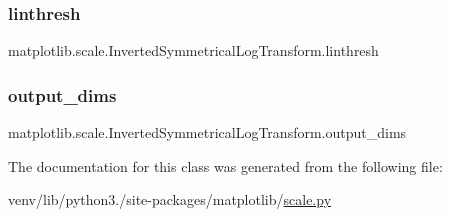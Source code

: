 \subsubsection{\texorpdfstring{linthresh}{linthresh}}
{\footnotesize\ttfamily matplotlib.\+scale.\+Inverted\+Symmetrical\+Log\+Transform.\+linthresh}

\mbox{\label{classmatplotlib_1_1scale_1_1InvertedSymmetricalLogTransform_ac87ff627c260c6e028ffb179ff7fa9b8}} 
\subsubsection{\texorpdfstring{output\+\_\+dims}{output\_dims}}
{\footnotesize\ttfamily matplotlib.\+scale.\+Inverted\+Symmetrical\+Log\+Transform.\+output\+\_\+dims\hspace{0.3cm}{\ttfamily [static]}}



The documentation for this class was generated from the following file\+:\begin{DoxyCompactItemize}
\item 
venv/lib/python3./site-\/packages/matplotlib/\hyperlink{scale_8py}{scale.\+py}\end{DoxyCompactItemize}
